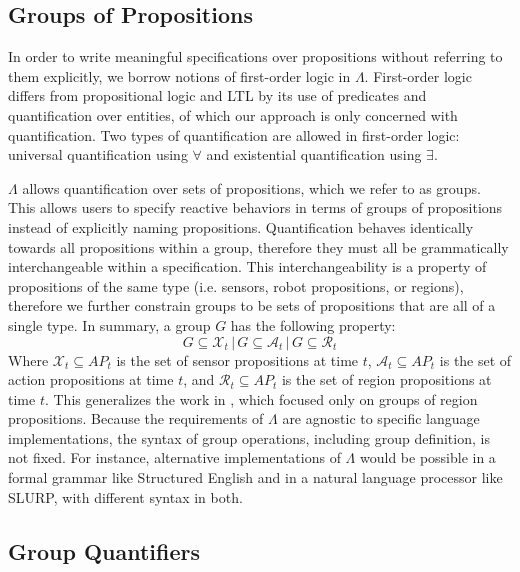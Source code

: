 \subsection{Groups of Propositions} 

In order to write meaningful specifications over propositions without referring to them explicitly, we borrow notions of first-order logic in $\Lambda$. 
First-order logic differs from propositional logic and LTL by its use of predicates and quantification over entities, of which our approach is only concerned with quantification. 
Two types of quantification are allowed in first-order logic: universal quantification using $\forall$ and existential quantification using $\exists$. 
\par $\Lambda$ allows quantification over sets of propositions, which we refer to as groups. 
This allows users to specify reactive behaviors in terms of groups of propositions instead of explicitly naming propositions. 
Quantification behaves identically towards all propositions within a group, therefore they must all be grammatically interchangeable within a specification. 
This interchangeability is a property of propositions of the same type (i.e. sensors, robot propositions, or regions), therefore we further constrain groups to be sets of propositions that are all of a single type. 
In summary, a group $G$ has the following property:
\begin{equation}
	G \subseteq \mathcal{X}_t\,|\,G \subseteq \mathcal{A}_t\,|\,G \subseteq \mathcal{R}_t
\end{equation}
Where $\mathcal{X}_t \subseteq AP_t$ is the set of sensor propositions at time $t$, $\mathcal{A}_t \subseteq AP_t$ is the set of action propositions at time $t$, and $\mathcal{R}_t \subseteq AP_t$ is the set of region propositions at time $t$. 
This generalizes the work in \cite{BingxinRSS2012}, which focused only on groups of region propositions. 
Because the requirements of $\Lambda$ are agnostic to specific language implementations, the syntax of group operations, including group definition, is not fixed. 
For instance, alternative implementations of $\Lambda$ would be possible in a formal grammar like Structured English\cite{Finucane2010} and in a natural language processor like SLURP\cite{RamanRSS2013}, with different syntax in both. 

\subsection{Group Quantifiers}

